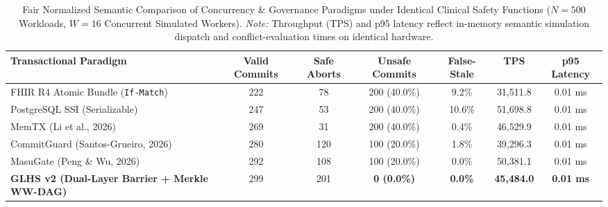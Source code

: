 \documentclass[11pt]{article}
\begin{document}
\begin{table}[t]
\centering
\small
\caption{Fair Normalized Semantic Comparison of Concurrency \& Governance Paradigms under Identical Clinical Safety Functions ($N=500$ Workloads, $W=16$ Concurrent Simulated Workers). \textit{Note:} Throughput (TPS) and p95 latency reflect in-memory semantic simulation dispatch and conflict-evaluation times on identical hardware.}
\label{tab:baseline_comparison}
\begin{tabularx}{\textwidth}{p{4.2cm} c c c c c c}
\toprule
\textbf{Transactional Paradigm} & \textbf{Valid Commits} & \textbf{Safe Aborts} & \textbf{Unsafe Commits} & \textbf{False-Stale} & \textbf{TPS} & \textbf{p95 Latency} \\
\midrule
FHIR R4 Atomic Bundle (\texttt{If-Match}) & 222 & 78 & 200 (40.0\%) & 9.2\% & 31,511.8 & 0.01 ms \\
PostgreSQL SSI (Serializable) & 247 & 53 & 200 (40.0\%) & 10.6\% & 51,698.8 & 0.01 ms \\
MemTX (Li et al., 2026) & 269 & 31 & 200 (40.0\%) & 0.4\% & 46,529.9 & 0.01 ms \\
CommitGuard (Santos-Grueiro, 2026) & 280 & 120 & 100 (20.0\%) & 1.8\% & 39,296.3 & 0.01 ms \\
MasuGate (Peng \& Wu, 2026) & 292 & 108 & 100 (20.0\%) & 0.0\% & 50,381.1 & 0.01 ms \\
\textbf{GLHS v2 (Dual-Layer Barrier + Merkle WW-DAG)} & 299 & 201 & \textbf{0 (0.0\%)} & \textbf{0.0\%} & \textbf{45,484.0} & \textbf{0.01 ms} \\
\bottomrule
\end{tabularx}
\end{table}
\end{document}
